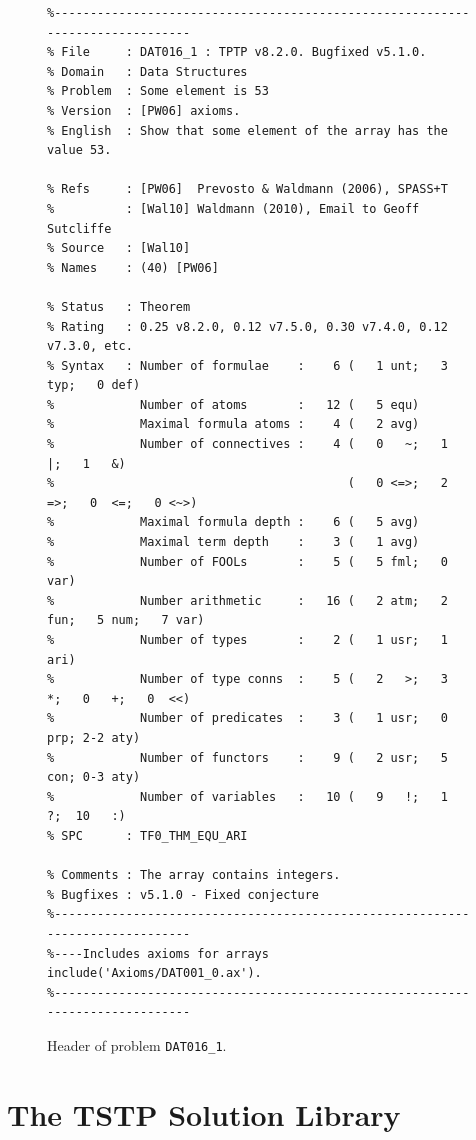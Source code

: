 \documentclass[runningheads]{llncs}
\begin{document}
\begin{figure}[htb]
\centering
{\scriptsize
{\setlength{\baselineskip}{2.5mm}
\begin{verbatim}
%------------------------------------------------------------------------------
% File     : DAT016_1 : TPTP v8.2.0. Bugfixed v5.1.0.
% Domain   : Data Structures
% Problem  : Some element is 53
% Version  : [PW06] axioms.
% English  : Show that some element of the array has the value 53.

% Refs     : [PW06]  Prevosto & Waldmann (2006), SPASS+T
%          : [Wal10] Waldmann (2010), Email to Geoff Sutcliffe
% Source   : [Wal10]
% Names    : (40) [PW06]

% Status   : Theorem
% Rating   : 0.25 v8.2.0, 0.12 v7.5.0, 0.30 v7.4.0, 0.12 v7.3.0, etc.
% Syntax   : Number of formulae    :    6 (   1 unt;   3 typ;   0 def)
%            Number of atoms       :   12 (   5 equ)
%            Maximal formula atoms :    4 (   2 avg)
%            Number of connectives :    4 (   0   ~;   1   |;   1   &)
%                                         (   0 <=>;   2  =>;   0  <=;   0 <~>)
%            Maximal formula depth :    6 (   5 avg)
%            Maximal term depth    :    3 (   1 avg)
%            Number of FOOLs       :    5 (   5 fml;   0 var)
%            Number arithmetic     :   16 (   2 atm;   2 fun;   5 num;   7 var)
%            Number of types       :    2 (   1 usr;   1 ari)
%            Number of type conns  :    5 (   2   >;   3   *;   0   +;   0  <<)
%            Number of predicates  :    3 (   1 usr;   0 prp; 2-2 aty)
%            Number of functors    :    9 (   2 usr;   5 con; 0-3 aty)
%            Number of variables   :   10 (   9   !;   1   ?;  10   :)
% SPC      : TF0_THM_EQU_ARI

% Comments : The array contains integers.
% Bugfixes : v5.1.0 - Fixed conjecture
%------------------------------------------------------------------------------
%----Includes axioms for arrays
include('Axioms/DAT001_0.ax').
%------------------------------------------------------------------------------
\end{verbatim}
}}
\caption{Header of problem {\tt DAT016\_1}.}
\label{ExampleHeader}
\end{figure}

\section{The TSTP Solution Library}
\label{TSTP}
\end{document}
